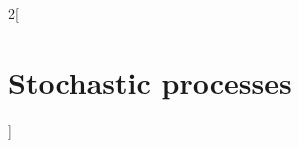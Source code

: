 \documentclass[../../../main_math.tex]{subfiles}
\begin{document}
\begin{multicols}{2}[\section{Stochastic processes}]

\end{multicols}
\end{document}
